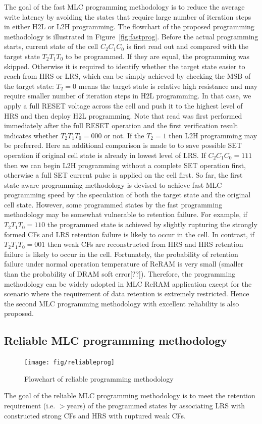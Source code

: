 The goal of the fast MLC programming methodology is to reduce the average write latency by avoiding the states that require large number of iteration steps in either H2L or L2H programming. The flowchart of the proposed programming methodology is illustrated in Figure~\ref{fig:fastprog}. Before the actual programming starts, current state of the cell $C_2C_1C_0$ is first read out and compared with the target state $T_2T_1T_0$ to be programmed. If they are equal, the programming was skipped. Otherwise it is required to identify whether the target state easier to reach from HRS or LRS, which can be simply achieved by checking the MSB of the target state: $T_2=0$ means the target state is relative high resistance and may require smaller number of iteration steps in H2L programming. In that case, we apply a full RESET voltage across the cell and push it to the highest level of HRS and then deploy H2L programming. Note that read was first performed immediately after the full RESET operation and the first verification result indicates whether $T_2T_1T_0=000$ or not. If the $T_2=1$ then L2H programming may be preferred. Here an additional comparison is made to to save possible SET operation if original cell state is already in lowest level of LRS. If $C_2C_1C_0=111$ then we can begin L2H programming without a complete SET operation first, otherwise a full SET current pulse is applied on the cell first. So far, the first state-aware programming methodology is devised to achieve fast MLC programming speed by the speculation of both the target state and the original cell state. However, some programmed states by the fast programming methodology may be somewhat vulnerable to retention failure. For example, if $T_2T_1T_0=110$ the programmed state is achieved by slightly rupturing the strongly formed CFs and LRS retention failure is likely to occur in the cell. In contrast, if $T_2T_1T_0=001$ then weak CFs are reconstructed from HRS and HRS retention failure is likely to occur in the cell. Fortunately, the probability of retention failure under normal operation temperature of ReRAM is very small (smaller than the probability of DRAM soft error[??]). Therefore, the programming methodology can be widely adopted in MLC ReRAM application except for the scenario where the requirement of data retention is extremely restricted. Hence the second MLC programming methodology with excellent reliability is also proposed.

\subsection{Reliable MLC programming methodology}
\begin{figure}[t]
\centering
\texttt{[image: fig/reliableprog]}
\vspace{-10pt}
\caption{Flowchart of reliable programming methodology}
\label{fig:reliableprog}
\vspace{-15pt}
\end{figure}

The goal of the reliable MLC programming methodology is to meet the retention requirement (i.e. $>$years) of the programmed states by associating LRS with constructed strong CFs and HRS with ruptured weak CFs. 

